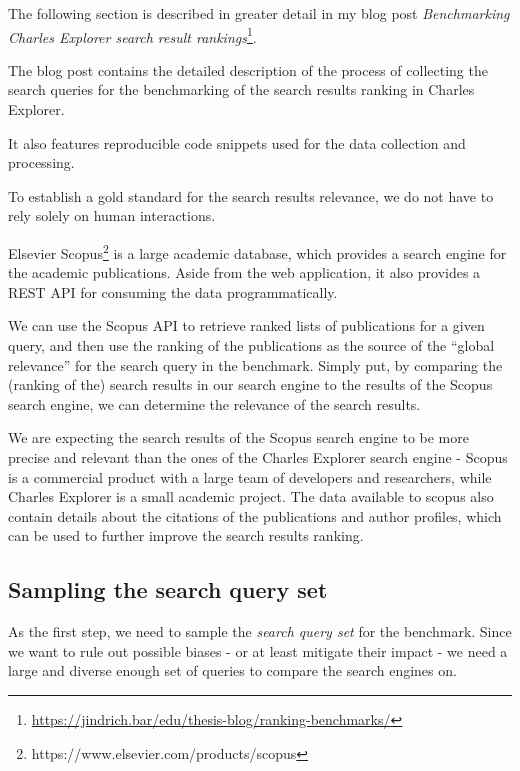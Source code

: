 \begin{mybox}{}
    The following section is described in greater detail in my blog post \textit{Benchmarking Charles Explorer search result rankings}\footnote{\url{https://jindrich.bar/edu/thesis-blog/ranking-benchmarks/}}.
    
    The blog post contains the detailed description of the process of collecting the search queries for the benchmarking of the search results ranking in Charles Explorer.

    It also features reproducible code snippets used for the data collection and processing.
\end{mybox}

To establish a gold standard for the search results relevance, we do not have to rely solely on human interactions.

Elsevier Scopus\footnote{https://www.elsevier.com/products/scopus} is a large academic database, which provides a search engine for the academic publications.
Aside from the web application, it also provides a REST API for consuming the data programmatically.

We can use the Scopus API to retrieve ranked lists of publications for a given query, and then use the ranking of the publications as the source of the ``global relevance'' for the search query in the benchmark.
Simply put, by comparing the (ranking of the) search results in our search engine to the results of the Scopus search engine, we can determine the relevance of the search results.

We are expecting the search results of the Scopus search engine to be more precise and relevant than the ones of the Charles Explorer search engine -
Scopus is a commercial product with a large team of developers and researchers, while Charles Explorer is a small academic project.
The data available to scopus also contain details about the citations of the publications and author profiles, which can be used to further improve the search results ranking.

\subsection{Sampling the search query set}

As the first step, we need to sample the \textit{search query set} for the benchmark. 
Since we want to rule out possible biases - or at least mitigate their impact - we need a large and diverse enough set of queries to compare the search engines on.

